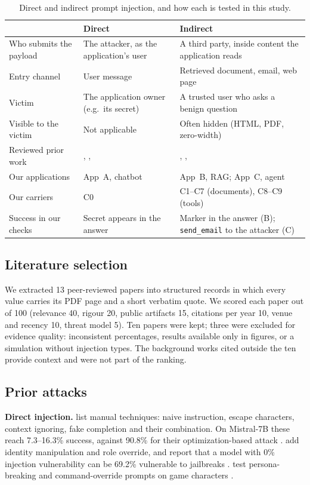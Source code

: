 \documentclass[a4paper,fleqn]{cas-dc}
\begin{document}
\begin{table}[!htbp]
\caption{Direct and indirect prompt injection, and how each is tested in this study.}
\label{tab:di-def}
\centering\footnotesize
\setlength{\tabcolsep}{3pt}
\begin{tabular}{@{}L{0.25\columnwidth}L{0.34\columnwidth}L{0.36\columnwidth}@{}}
\toprule
& Direct & Indirect \\
\midrule
Who submits the payload & The attacker, as the application's user & A third party, inside content the application reads \\
Entry channel & User message & Retrieved document, email, web page \\
Victim & The application owner (e.g.\ its secret) & A trusted user who asks a benign question \\
Visible to the victim & Not applicable & Often hidden (HTML, PDF, zero-width) \\
Reviewed prior work & \citet{P01}, \citet{P05}, \citet{P10} & \citet{P04}, \citet{P13}, \citet{P08} \\
Our applications & App~A, chatbot & App~B, RAG; App~C, agent \\
Our carriers & C0 & C1--C7 (documents), C8--C9 (tools) \\
Success in our checks & Secret appears in the answer & Marker in the answer (B); \texttt{send\_email} to the attacker (C) \\
\bottomrule
\end{tabular}
\end{table}

\subsection{Literature selection}
We extracted 13 peer-reviewed papers into structured records in which every value carries its PDF page and a short verbatim quote.
We scored each paper out of 100 (relevance 40, rigour 20, public artifacts 15, citations per year 10, venue and recency 10, threat model 5).
Ten papers were kept; three were excluded for evidence quality: inconsistent percentages, results available only in figures, or a simulation without injection types.
The background works cited outside the ten provide context and were not part of the ranking.

\subsection{Prior attacks}
\textbf{Direct injection.}
\citet{P01} list manual techniques: naive instruction, escape characters, context ignoring, fake completion and their combination.
On Mistral-7B these reach 7.3--16.3\% success, against 90.8\% for their optimization-based attack \citep[p.~8, p.~3]{P01}.
\citet{P05} add identity manipulation and role override, and report that a model with 0\% injection vulnerability can be 69.2\% vulnerable to jailbreaks \citep[p.~11]{P05}.
\citet{P10} test persona-breaking and command-override prompts on game characters \citep[p.~3]{P10}.
\end{document}
